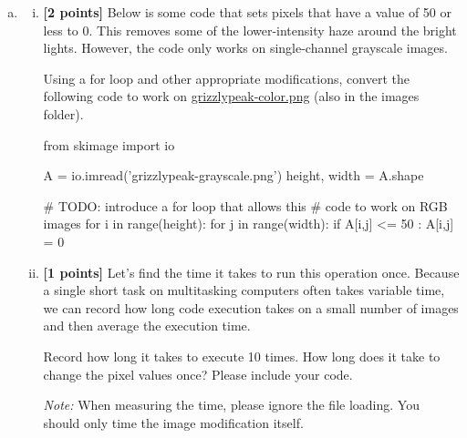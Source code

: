 \documentclass[11pt]{article}
\begin{document}
\begin{enumerate}[(a)]
    \item 
    \begin{enumerate}[(i)] \item
\textbf{[2 points]}
Below is some code that sets pixels that have a value of 50 or less to 0. This removes some of the lower-intensity haze around the bright lights. However, the code only works on single-channel grayscale images.

\begin{tcolorbox}[colback=orange!5!white,colframe=orange!75!black]
Using a for loop and other appropriate modifications, convert the following code to work on \href{run:images/grizzlypeak-color.png}{grizzlypeak-color.png} (also in the images folder).
\end{tcolorbox}

\begin{tcolorbox}[enhanced jigsaw,pad at break*=1mm,colback=white!5!white,colframe=green!75!black,height=10cm]
\begin{python}
from skimage import io

A = io.imread('grizzlypeak-grayscale.png')
height, width = A.shape

# TODO: introduce a for loop that allows this 
# code to work on RGB images
for i in range(height):
    for j in range(width):
        if A[i,j] <= 50 :
            A[i,j] = 0
\end{python}
\end{tcolorbox}

\item
\textbf{[1 points]} Let's find the time it takes to run this operation once. Because a single short task on multitasking computers often takes variable time, we can record how long code execution takes on a small number of images and then average the execution time.

\begin{tcolorbox}[colback=orange!5!white,colframe=orange!75!black]
Record how long it takes to execute 10 times. How long does it take to change the pixel values once? Please include your code.
\end{tcolorbox}

\emph{Note: } When measuring the time, please ignore the file loading. You should only time the image modification itself.

\end{enumerate}
\end{enumerate}
\end{document}
